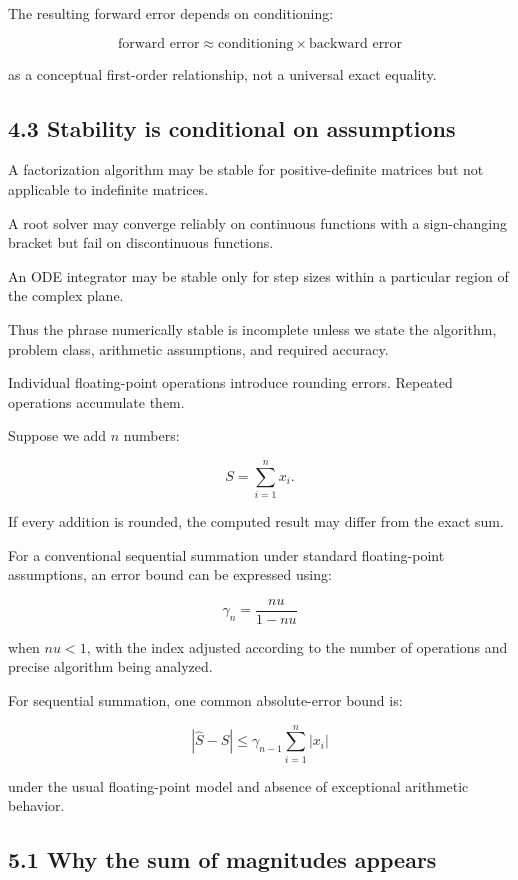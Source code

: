 The resulting forward error depends on conditioning:

\[ \boxed{ \text{forward error} \approx \text{conditioning}\times \text{backward error} } \]

as a conceptual first-order relationship, not a universal exact equality.

\subsection{4.3 Stability is conditional on assumptions}\label{02-foundations-ii-ch028-stability-is-conditional-on-assumptions}

A factorization algorithm may be stable for positive-definite matrices but not applicable to indefinite matrices.

A root solver may converge reliably on continuous functions with a sign-changing bracket but fail on discontinuous functions.

An ODE integrator may be stable only for step sizes within a particular region of the complex plane.

Thus the phrase numerically stable is incomplete unless we state the algorithm, problem class, arithmetic assumptions, and required accuracy.

Individual floating-point operations introduce rounding errors. Repeated operations accumulate them.

Suppose we add \(n\) numbers:

\[ S=\sum_{i=1}^{n}x_i. \]

If every addition is rounded, the computed result may differ from the exact sum.

For a conventional sequential summation under standard floating-point assumptions, an error bound can be expressed using:

\[ \boxed{ \gamma_n= \frac{nu}{1-nu} } \]

when \(nu<1\), with the index adjusted according to the number of operations and precise algorithm being analyzed.

For sequential summation, one common absolute-error bound is:

\[ \boxed{ |\hat S-S| \le \gamma_{n-1} \sum_{i=1}^{n}|x_i| } \]

under the usual floating-point model and absence of exceptional arithmetic behavior.

\subsection{5.1 Why the sum of magnitudes appears}\label{02-foundations-ii-ch028-why-the-sum-of-magnitudes-appears}

